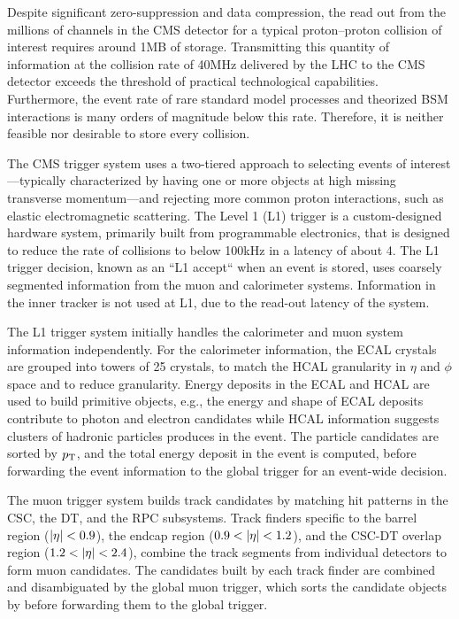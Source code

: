 Despite significant zero-suppression and data compression, the
read out from the millions of channels in the CMS detector for
a typical proton--proton collision of interest requires around
1\unit{MB} of storage.
Transmitting this quantity of information 
at the collision rate of 40\unit{MHz} delivered by the LHC to the CMS detector 
exceeds the threshold of practical technological capabilities. Furthermore,
the event rate of rare standard model processes and theorized BSM interactions
is many orders of magnitude below this rate. 
Therefore, it is neither feasible 
nor desirable to store every collision.

The CMS trigger system uses a two-tiered approach to selecting events of 
interest---typically characterized by having one or more objects
at high missing transverse momentum---and rejecting more common proton 
interactions, such as elastic electromagnetic scattering.
The Level 1 (L1) trigger is a custom-designed hardware system,
primarily built from programmable electronics, that
is designed to reduce the rate of collisions to below 100\unit{kHz}
in a latency of about 4\mus. The L1 trigger decision,
known as an ``L1 accept`` when an event is stored,
uses coarsely segmented
information from the muon and calorimeter systems.
Information in the inner tracker is not used at L1, due to the read-out
latency of the system. 

The L1 trigger system initially handles the calorimeter and muon system
information independently. For the calorimeter information, the ECAL crystals
are grouped into towers of 25 crystals, to match the HCAL granularity
in $\eta$ and $\phi$ space and to reduce granularity. Energy deposits in
the ECAL and HCAL are used to build primitive objects, e.g., 
the energy and shape of ECAL deposits
contribute to photon and electron candidates while HCAL information
suggests clusters of hadronic particles produces in the event.
The particle candidates are sorted by $p_{\mathrm{T}}$, and the total energy deposit
in the event is computed, before forwarding the event information to
the global trigger for an event-wide decision.

The muon trigger system builds track candidates by matching hit
patterns in the CSC, the DT, and the RPC subsystems. Track finders
specific to the barrel region ($\lvert \eta \rvert < 0.9$), the endcap region
($0.9 < \lvert \eta \rvert < 1.2$), and the CSC-DT overlap region ($1.2 < \lvert \eta \rvert < 2.4$),
combine the track segments from individual detectors to form muon
candidates. The candidates built by each track finder are combined
and disambiguated by the global muon trigger, which sorts the 
candidate objects by \pt before forwarding them to the global trigger.

